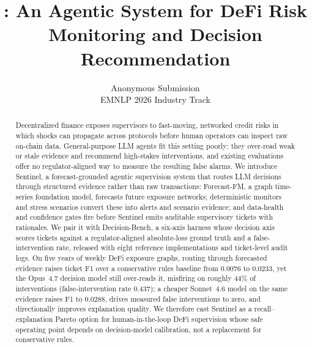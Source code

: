 \documentclass[11pt]{article}
\title{\sysname{}: An Agentic System for DeFi Risk Monitoring and Decision Recommendation}
\author{Anonymous Submission \\
        EMNLP 2026 Industry Track}
\newcommand{\sysname}{Sentinel}
\newcommand{\fmname}{Forecast-FM}
\newcommand{\benchname}{Decision-Bench}
\newcommand{\sysname}{DeXposure-Claw}
\newcommand{\fmname}{DeXposure-FM}
\newcommand{\benchname}{DeXposure-Bench}
\begin{document}
\maketitle

\begin{abstract}
Decentralized finance exposes supervisors to fast-moving, networked credit risks in which shocks can propagate across protocols before human operators can inspect raw on-chain data. General-purpose LLM agents fit this setting poorly: they over-read weak or stale evidence and recommend high-stakes interventions, and existing evaluations offer no regulator-aligned way to measure the resulting false alarms. We introduce \sysname{}, a forecast-grounded agentic supervision system that routes LLM decisions through structured evidence rather than raw transactions: \fmname{}, a graph time-series foundation model, forecasts future exposure networks; deterministic monitors and stress scenarios convert these into alerts and scenario evidence; and data-health and confidence gates fire before \sysname{} emits auditable supervisory tickets with rationales. We pair it with \benchname{}, a six-axis harness whose decision axis scores tickets against a regulator-aligned absolute-loss ground truth and a false-intervention rate, released with eight reference implementations and ticket-level audit logs. On five years of weekly DeFi exposure graphs, routing through forecasted evidence raises ticket F1 over a conservative rules baseline from 0.0076 to 0.0233, yet the Opus~4.7 decision model still over-reads it, misfiring on roughly 44\% of interventions (false-intervention rate 0.437); a cheaper Sonnet~4.6 model on the same evidence raises F1 to 0.0288, drives measured false interventions to zero, and directionally improves explanation quality. We therefore cast \sysname{} as a recall--explanation Pareto option for human-in-the-loop DeFi supervision whose safe operating point depends on decision-model calibration, not a replacement for conservative rules.
\end{abstract}














\clearpage
\onecolumn
\appendix
\makeatletter
{}
\makeatother
\renewcommand{\thealgorithm}{\thesection.\arabic{algorithm}}
\renewcommand{\thefigure}{\thesection.\arabic{figure}}
\renewcommand{\thetable}{\thesection.\arabic{table}}



\end{document}
